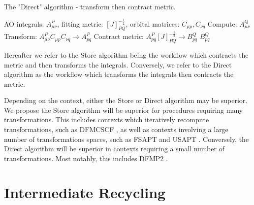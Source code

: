 \begin{algorithm}[H]
\caption{The "Direct" algorithm - transform then contract metric.}
\begin{algorithmic}
\REQUIRE AO integrals: $A_{\mu \nu}^P$, fitting metric: $[J]_{PQ}^{-\frac{1}{2}}$, orbital matrices: $C_{\mu p}, C_{\nu q}$
\STATE Compute: $A_{\mu \nu}^Q$
    \STATE Transform: $A_{\mu \nu}^PC_{\mu p}C_{\nu q} \rightarrow A_{p q}^P$
    \STATE Contract metric: $A_{p q}^P [J]_{PQ}^{-\frac{1}{2}} \rightarrow B_{p q}^Q$
\ENDFOR
\RETURN $B_{p q}^Q$
\end{algorithmic}
\end{algorithm}

\noindent Hereafter we refer to the Store algorithm being the workflow which contracts the metric and then transforms the integrals. Conversely, 
we refer to the Direct algorithm as the workflow which transforms the integrals then contracts the metric. 

Depending on the context, either the Store or Direct algorithm may be superior. We propose the Store algorithm 
will be superior for procedures requiring
many transformations. This includes contexts which iteratively recompute transformations, such as DFMCSCF \cite{??}, as well as contexts 
involving a large number of transformations spaces, such as FSAPT and USAPT \cite{ref6} \cite{ref7}. 
Conversely, the Direct algorithm will be superior in contexts requiring a small number of transformations. Most notably, 
this includes DFMP2 \cite{ref4}.

%

\section{Intermediate Recycling}

